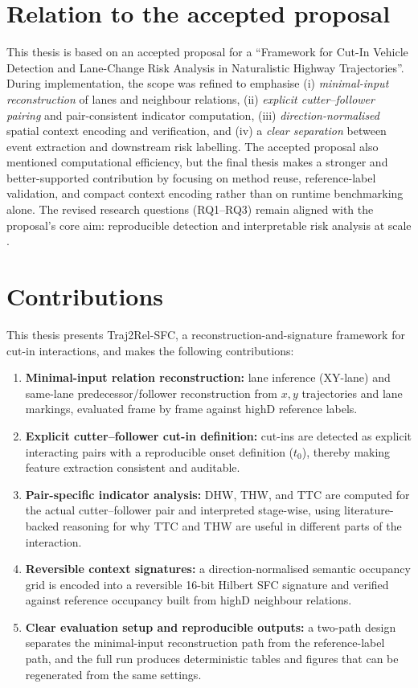 \documentclass[12pt,a4paper,twoside,openright]{report}
\newcommand{\FrameworkName}{Traj2Rel-SFC}
\begin{document}
    \section{Relation to the accepted proposal}
    This thesis is based on an accepted proposal for a ``Framework for Cut-In Vehicle Detection and Lane-Change Risk Analysis in Naturalistic Highway Trajectories''. During implementation, the scope was refined to emphasise (i) \emph{minimal-input reconstruction} of lanes and neighbour relations, (ii) \emph{explicit cutter--follower pairing} and pair-consistent indicator computation, (iii) \emph{direction-normalised} spatial context encoding and verification, and (iv) a \emph{clear separation} between event extraction and downstream risk labelling. The accepted proposal also mentioned computational efficiency, but the final thesis makes a stronger and better-supported contribution by focusing on method reuse, reference-label validation, and compact context encoding rather than on runtime benchmarking alone. The revised research questions (RQ1--RQ3) remain aligned with the proposal's core aim: reproducible detection and interpretable risk analysis at scale \cite{highd_2018,wang2021ssm}.

    \section{Contributions}
    This thesis presents \FrameworkName{}, a reconstruction-and-signature framework for cut-in interactions, and makes the following contributions:

    \begin{enumerate}[leftmargin=1.6em]
  \item \textbf{Minimal-input relation reconstruction:} lane inference (XY-lane) and same-lane predecessor/follower reconstruction from $x,y$ trajectories and lane markings, evaluated frame by frame against highD reference labels.
  \item \textbf{Explicit cutter--follower cut-in definition:} cut-ins are detected as explicit interacting pairs with a reproducible onset definition ($t_0$), thereby making feature extraction consistent and auditable.
  \item \textbf{Pair-specific indicator analysis:} DHW, THW, and TTC are computed for the actual cutter--follower pair and interpreted stage-wise, using literature-backed reasoning for why TTC and THW are useful in different parts of the interaction.
  \item \textbf{Reversible context signatures:} a direction-normalised semantic occupancy grid is encoded into a reversible 16-bit Hilbert SFC signature and verified against reference occupancy built from highD neighbour relations.
  \item \textbf{Clear evaluation setup and reproducible outputs:} a two-path design separates the minimal-input reconstruction path from the reference-label path, and the full run produces deterministic tables and figures that can be regenerated from the same settings.
    \end{enumerate}
\end{document}
